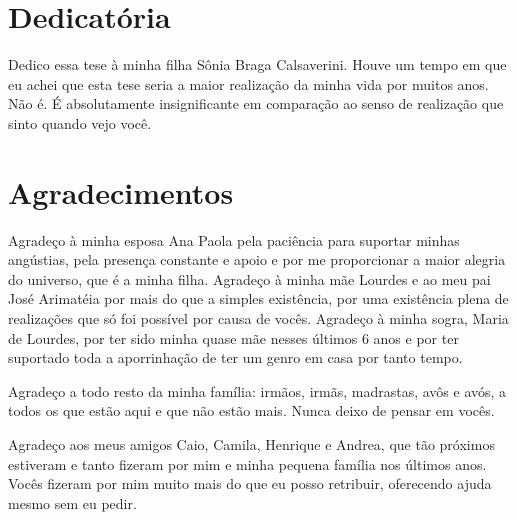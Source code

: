 \begin{titlepage}

\chapter*{Dedicatória}

Dedico essa tese à minha filha Sônia Braga Calsaverini. Houve um tempo em que eu achei que esta tese seria a maior realização da minha vida por muitos anos. Não é. É absolutamente insignificante em comparação ao senso de realização que sinto quando vejo você.

\chapter*{Agradecimentos}

Agradeço à minha esposa Ana Paola pela paciência para suportar minhas angústias, pela presença constante e apoio e por me proporcionar a maior alegria do universo, que é a minha filha. Agradeço à minha mãe Lourdes e ao meu pai José Arimatéia por mais do que a simples existência, por uma existência plena de realizações que só foi possível por causa de vocês. Agradeço à minha sogra, Maria de Lourdes, por ter sido minha quase mãe nesses últimos 6 anos e por ter suportado toda a aporrinhação de ter um genro em casa por tanto tempo.

Agradeço a todo resto da minha família: irmãos, irmãs, madrastas, avôs e avós, a todos os que estão aqui e que não estão mais. Nunca deixo de pensar em vocês. 

Agradeço aos meus amigos Caio, Camila, Henrique e Andrea, que tão próximos estiveram e tanto fizeram por mim e minha pequena família nos últimos anos. Vocês fizeram por mim muito mais do que eu posso retribuir, oferecendo ajuda mesmo sem eu pedir.

\end{titlepage}